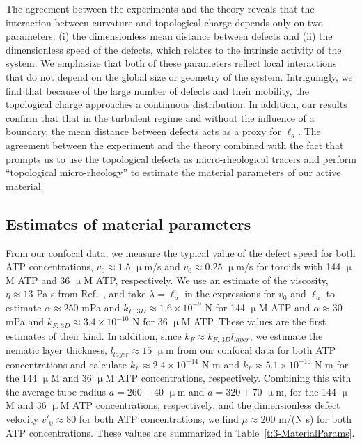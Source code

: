 The agreement between the experiments and the theory reveals that the interaction between curvature and topological charge depends only on two parameters: (i) the dimensionless mean distance between defects and (ii) the dimensionless speed of the defects, which relates to the intrinsic activity of the system.
We emphasize that both of these parameters reflect local interactions that do not depend on the global size or geometry of the system.
Intriguingly, we find that because of the large number of defects and their mobility, the topological charge approaches a continuous distribution. In addition, our results confirm that that in the turbulent regime and without the influence of a boundary, the mean distance between defects acts as a
proxy for $\ell_a$.
The agreement between the experiment and the theory combined with the fact that prompts us to use the topological defects as micro-rheological tracers and perform “topological micro-rheology” to estimate the material parameters of our active material.


\subsection{Estimates of material parameters}
From our confocal data, we measure the typical value of the defect speed for both ATP concentrations, $v_0 \approx 1.5$ $\upmu$m/s and $v_0 \approx 0.25$ $\upmu$m/s for toroids with 144 $\upmu$M ATP and 36 $\upmu$M ATP, respectively.
We use an estimate of the viscosity, $\eta \approx 13$ Pa s from Ref.~\cite{RN135}, and take $\lambda = \ell_a$ in the expressions for $v_0$ and $\ell_a$ to estimate $\alpha \approx  250$ mPa and $k_{F,\, 3D} \approx 1.6 \times 10^{-9}$ N for 144 $\upmu$M ATP and $\alpha \approx  30$ mPa and $k_{F,\, 3D} \approx 3.4 \times 10^{-10}$ N for 36 $\upmu$M ATP.
These values are the first estimates of their kind.
In addition, since $k_F \approx k_{F,\,3D}l_{layer}$, we estimate the nematic layer thickness, $l_{layer} \approx 15$ $\upmu$m from our confocal data for both ATP concentrations and calculate $k_F \approx 2.4 \times 10^{-14}$ N m and $k_F \approx 5.1 \times 10^{-15}$ N m for the 144 $\upmu$M and 36 $\upmu$M ATP concentrations, respectively.
Combining this with the average tube radius $a = 260 \pm 40$ $\upmu$m and $a = 320 \pm 70$ $\upmu$m, for the 144 $\upmu$M and 36 $\upmu$M ATP concentrations, respectively, and the dimensionless defect velocity $v'_0 \approx 80$ for both ATP concentrations, we find $\mu \approx 200$ m/(N s) for both ATP concentrations.
These values are summarized in Table~\ref{t:3-MaterialParams}.

